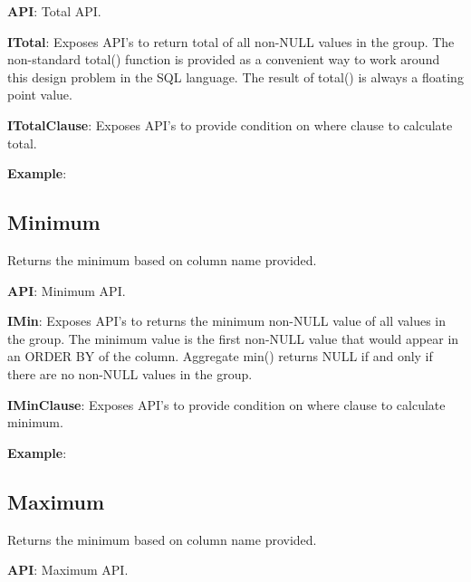 			\textbf{API}: Total API.
				
		
			\textbf{ITotal}:     Exposes API's to return total of all non-NULL values in the group.
 						The non-standard total() function is provided as a convenient way to work around this design problem in the SQL language.
						The result of total() is always a floating point value.


				

			
			\textbf{ITotalClause}: Exposes API's to provide condition on where clause to calculate total.
				

			\textbf{Example}: 
				


	\subsection{Minimum} 
		\par 
		Returns the minimum based on column name provided.

			\textbf{API}: Minimum API.
				
		
			\textbf{IMin}:      Exposes API's to returns the minimum non-NULL value of all values in the group.
						The minimum value is the first non-NULL value that would appear in an ORDER BY of the column.
						Aggregate min() returns NULL if and only if there are no non-NULL values in the group.


				

			
			\textbf{IMinClause}: Exposes API's to provide condition on where clause to calculate minimum.
				

			\textbf{Example}: 
				



	\subsection{Maximum} 
		\par 
		Returns the minimum based on column name provided.

			\textbf{API}: Maximum API.
				
		

